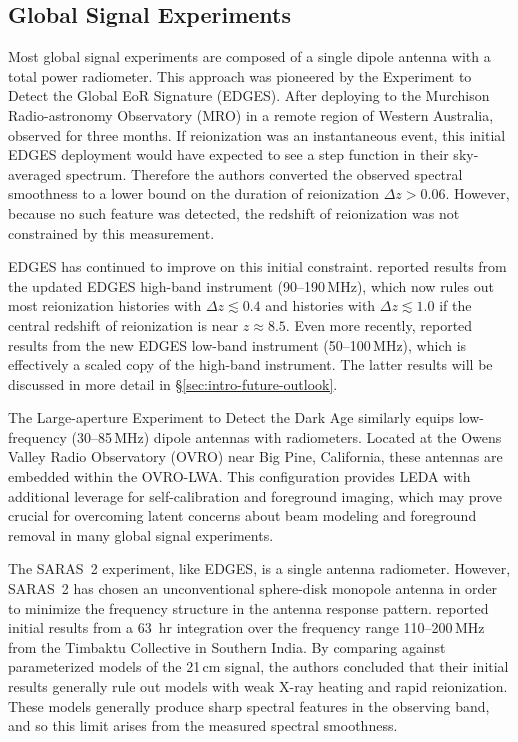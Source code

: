 \begin{bibunit}

\subsection{Global Signal Experiments}

Most global signal experiments are composed of a single dipole antenna with a total power
radiometer. This approach was pioneered by the Experiment to Detect the Global EoR Signature
(EDGES). After deploying to the Murchison Radio-astronomy Observatory (MRO) in a remote region of
Western Australia, \citet{2010Natur.468..796B} observed for three months. If reionization was an
instantaneous event, this initial EDGES deployment would have expected to see a step function in
their sky-averaged spectrum. Therefore the authors converted the observed spectral smoothness to a
lower bound on the duration of reionization $\Delta z > 0.06$. However, because no such feature was
detected, the redshift of reionization was not constrained by this measurement.

EDGES has continued to improve on this initial constraint.  \citet{2017ApJ...847...64M} reported
results from the updated EDGES high-band instrument (90--190\,MHz), which now rules out most
reionization histories with $\Delta z \lesssim 0.4$ and histories with $\Delta z \lesssim 1.0$ if
the central redshift of reionization is near $z\approx 8.5$. Even more recently,
\citet{2018Natur.555...67B} reported results from the new EDGES low-band instrument (50--100\,MHz),
which is effectively a scaled copy of the high-band instrument. The latter results will be discussed
in more detail in \S\ref{sec:intro-future-outlook}.

The Large-aperture Experiment to Detect the Dark Age \citep[LEDA;][]{2018MNRAS.478.4193P} similarly
equips low-frequency (30--85\,MHz) dipole antennas with radiometers. Located at the Owens Valley
Radio Observatory (OVRO) near Big Pine, California, these antennas are embedded within the OVRO-LWA.
This configuration provides LEDA with additional leverage for self-calibration and foreground
imaging, which may prove crucial for overcoming latent concerns about beam modeling and foreground
removal in many global signal experiments.

The SARAS~2 experiment, like EDGES, is a single antenna radiometer. However, SARAS~2 has chosen an
unconventional sphere-disk monopole antenna in order to minimize the frequency structure in the
antenna response pattern. \citet{2017ApJ...845L..12S} reported initial results from a 63~hr
integration over the frequency range 110--200\,MHz from the Timbaktu Collective in Southern India.
By comparing against parameterized models of the 21\,cm signal, the authors concluded that their
initial results generally rule out models with weak X-ray heating and rapid reionization. These
models generally produce sharp spectral features in the observing band, and so this limit arises
from the measured spectral smoothness.


\end{bibunit}
